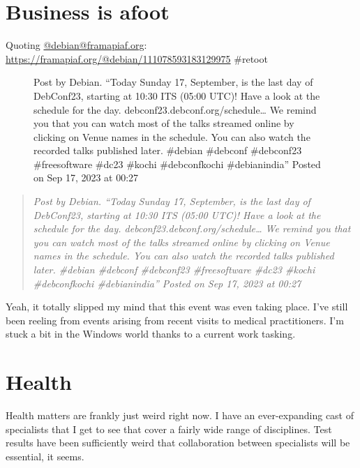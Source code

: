 \section{Business is afoot}\label{business-is-afoot}

Quoting \href{https://framapiaf.org/@debian}{@debian@framapiaf.org}:
\url{https://framapiaf.org/@debian/111078593183129975} \#retoot

\begin{figure}
\centering
{}
\caption{Post by Debian. ``Today Sunday 17, September, is the last day
of DebConf23, starting at 10:30 ITS (05:00 UTC)! Have a look at the
schedule for the day. debconf23.debconf.org/schedule\ldots{} We remind
you that you can watch most of the talks streamed online by clicking on
Venue names in the schedule. You can also watch the recorded talks
published later. \#debian \#debconf \#debconf23 \#freesoftware \#dc23
\#kochi \#debconfkochi \#debianindia'' Posted on Sep 17, 2023 at 00:27}
\end{figure}

\begin{quote}
\emph{Post by Debian. ``Today Sunday 17, September, is the last day of
DebConf23, starting at 10:30 ITS (05:00 UTC)! Have a look at the
schedule for the day. debconf23.debconf.org/schedule\ldots{} We remind
you that you can watch most of the talks streamed online by clicking on
Venue names in the schedule. You can also watch the recorded talks
published later. \#debian \#debconf \#debconf23 \#freesoftware \#dc23
\#kochi \#debconfkochi \#debianindia'' Posted on Sep 17, 2023 at 00:27}
\end{quote}

Yeah, it totally slipped my mind that this event was even taking place.
I've still been reeling from events arising from recent visits to
medical practitioners. I'm stuck a bit in the Windows world thanks to a
current work tasking.

\section{Health}\label{health}

Health matters are frankly just weird right now. I have an
ever-expanding cast of specialists that I get to see that cover a fairly
wide range of disciplines. Test results have been sufficiently weird
that collaboration between specialists will be essential, it seems.

